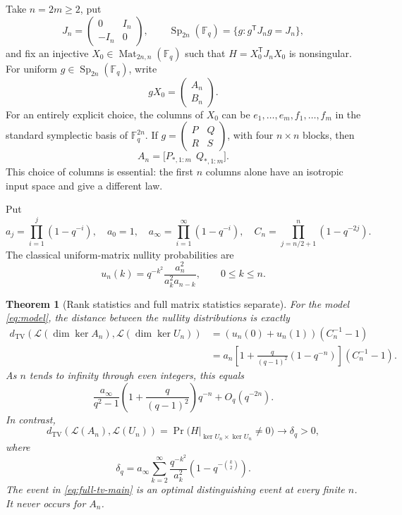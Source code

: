 \documentclass[11pt]{article}
\newcommand{\F}{\mathbb F_q}
\newcommand{\Sp}{\operatorname{Sp}}
\newcommand{\TV}{d_{\mathrm{TV}}}
\newcommand{\Law}{\mathcal L}
\newcommand{\Mat}{\operatorname{Mat}}
\newcommand{\1}{\mathbf 1}
\newtheorem{theorem}{Theorem}[section]
\theoremstyle{definition}
\theoremstyle{remark}
\numberwithin{equation}{section}
\begin{document}
Take $n=2m\ge2$, put
\[
J_n=\begin{pmatrix}0&I_n\\-I_n&0\end{pmatrix},\qquad
\Sp_{2n}(\F)=\{g:g^{\mathsf T}J_ng=J_n\},
\]
and fix an injective $X_0\in\Mat_{2n,n}(\F)$ such that
$H=X_0^{\mathsf T}J_nX_0$ is nonsingular. For uniform $g\in\Sp_{2n}(\F)$, write
\begin{equation}\label{eq:model}
gX_0=\begin{pmatrix}A_n\\B_n\end{pmatrix}.
\end{equation}
For an entirely explicit choice, the columns of $X_0$ can be
$e_1,\ldots,e_m,f_1,\ldots,f_m$ in the standard symplectic basis of $\F^{2n}$. If
$g=\left(\begin{smallmatrix}P&Q\\R&S\end{smallmatrix}\right)$, with four $n\times n$ blocks, then
\[
A_n=\bigl[P_{*,1:m}\ \ Q_{*,1:m}\bigr].
\]
This choice of columns is essential: the first $n$ columns alone have an isotropic input space and give a different law.

Put
\begin{equation}\label{eq:standard-products}
a_j=\prod_{i=1}^j(1-q^{-i}),\quad a_0=1,\quad
a_\infty=\prod_{i=1}^\infty(1-q^{-i}),\quad
C_n=\prod_{j=n/2+1}^n(1-q^{-2j}).
\end{equation}
The classical uniform-matrix nullity probabilities are
\begin{equation}\label{eq:uniform-nullity}
u_n(k)=q^{-k^2}\frac{a_n^2}{a_k^2a_{n-k}},\qquad 0\le k\le n.
\end{equation}

\begin{theorem}[Rank statistics and full matrix statistics separate]\label{thm:main}
For the model \eqref{eq:model}, the distance between the nullity distributions is exactly
\begin{align}
\TV(\Law(\dim\ker A_n),\Law(\dim\ker U_n))
 &=(u_n(0)+u_n(1))(C_n^{-1}-1)\label{eq:rank-tv-main}\\
 &=a_n\left[1+\frac{q}{(q-1)^2}(1-q^{-n})\right](C_n^{-1}-1).\nonumber
\end{align}
As $n$ tends to infinity through even integers, this equals
\begin{equation}\label{eq:rank-asymp-main}
\frac{a_\infty}{q^2-1}\left(1+\frac{q}{(q-1)^2}\right)q^{-n}
 +O_q(q^{-2n}).
\end{equation}
In contrast,
\begin{equation}\label{eq:full-tv-main}
\TV(\Law(A_n),\Law(U_n))
=\Pr\bigl(H|_{\ker U_n\times\ker U_n}\ne0\bigr)
\longrightarrow\delta_q>0,
\end{equation}
where
\begin{equation}\label{eq:delta}
\delta_q=a_\infty\sum_{k=2}^\infty
\frac{q^{-k^2}}{a_k^2}\left(1-q^{-\binom{k}{2}}\right).
\end{equation}
The event in \eqref{eq:full-tv-main} is an optimal distinguishing event at every finite $n$. It never occurs for $A_n$.
\end{theorem}
\end{document}
